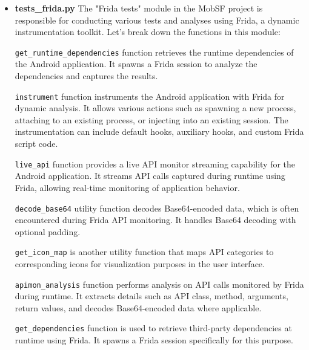 \documentclass{report}
\begin{document}
\begin{itemize}
\begin{itemize}
        \item \textbf {tests\_frida.py}
        The "Frida tests" module in the MobSF project is responsible for conducting various tests and analyses using Frida, a dynamic instrumentation toolkit. Let's break down the functions in this module:

        \texttt{get\_runtime\_dependencies} function retrieves the runtime dependencies of the Android application. It spawns a Frida session to analyze the dependencies and captures the results.
        
        \texttt{instrument} function instruments the Android application with Frida for dynamic analysis. It allows various actions such as spawning a new process, attaching to an existing process, or injecting into an existing session. The instrumentation can include default hooks, auxiliary hooks, and custom Frida script code.
        
        \texttt{live\_api} function provides a live API monitor streaming capability for the Android application. It streams API calls captured during runtime using Frida, allowing real-time monitoring of application behavior.
        
        \texttt{decode\_base64} utility function decodes Base64-encoded data, which is often encountered during Frida API monitoring. It handles Base64 decoding with optional padding.
        
        \texttt{get\_icon\_map} is another utility function that maps API categories to corresponding icons for visualization purposes in the user interface.
        
        \texttt{apimon\_analysis} function performs analysis on API calls monitored by Frida during runtime. It extracts details such as API class, method, arguments, return values, and decodes Base64-encoded data where applicable.
        
        \texttt{get\_dependencies} function is used to retrieve third-party dependencies at runtime using Frida. It spawns a Frida session specifically for this purpose.
        

\end{itemize}
\end{itemize}
\end{document}
